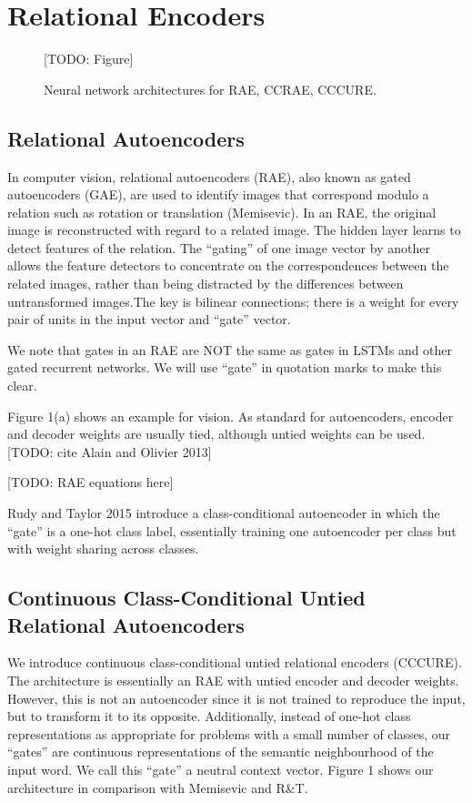 \documentclass[11pt]{article}
\begin{document}
\section{Relational Encoders}

\begin{figure*}[h!t]
\vspace{20mm}
[TODO: Figure]
\vspace{20mm}
\caption{Neural network architectures for RAE, CCRAE, CCCURE.}
\end{figure*}



\subsection{Relational Autoencoders}

In computer vision, relational autoencoders (RAE), also known as gated autoencoders (GAE), are used to identify images that correspond modulo a relation such as rotation or translation (Memisevic). In an RAE, the original image is reconstructed with regard to a related image. The hidden layer learns to detect features of the relation. The ``gating'' of one image vector by another allows the feature detectors to concentrate on the correspondences between the related images, rather than being distracted by the differences between untransformed images.The key is bilinear connections; there is a weight for every pair of units in the input vector and ``gate'' vector.

We note that gates in an RAE are NOT the same as gates in LSTMs and other gated recurrent networks. We will use ``gate'' in quotation marks to make this clear.

Figure 1(a) shows an example for vision. As standard for autoencoders, encoder and decoder weights are usually tied, although untied weights can be used. [TODO: cite Alain and Olivier 2013]

[TODO: RAE equations here]

Rudy and Taylor 2015 introduce a class-conditional autoencoder in which the ``gate'' is a one-hot class label, essentially training one autoencoder per class but with weight sharing across classes.

\subsection{Continuous Class-Conditional Untied Relational Autoencoders}

We introduce continuous class-conditional untied relational encoders (CCCURE). The architecture is essentially an RAE with untied encoder and decoder weights. However, this is not an autoencoder since it is not trained to reproduce the input, but to transform it to its opposite. Additionally, instead of one-hot class representations as appropriate for problems with a small number of classes, our ``gates'' are continuous representations of the semantic neighbourhood of the input word. We call this ``gate'' a neutral context vector. Figure 1 shows our architecture in comparison with Memisevic and R\&T.
\end{document}
